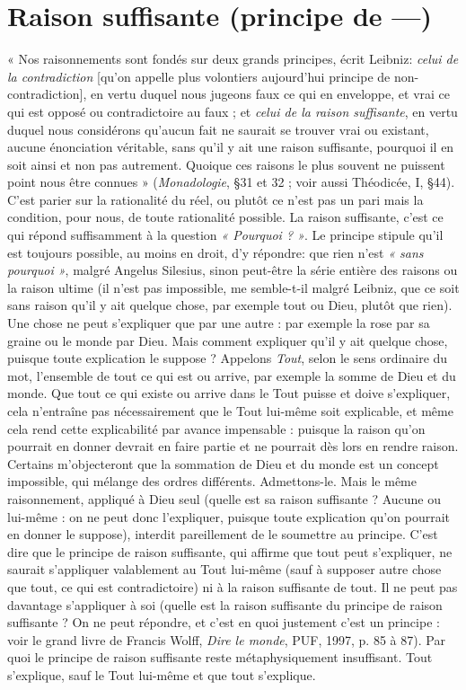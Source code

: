 \section{Raison suffisante (principe de —)}
« Nos raisonnements sont fondés sur deux grands principes,
écrit Leibniz: {\it celui de la contradiction} [qu’on appelle plus volontiers
aujourd’hui principe de non-contradiction], en vertu duquel nous jugeons
faux ce qui en enveloppe, et vrai ce qui est opposé ou contradictoire au faux ;
et {\it celui de la raison suffisante}, en vertu duquel nous considérons qu'aucun fait
ne saurait se trouver vrai ou existant, aucune énonciation véritable, sans qu'il
y ait une raison suffisante, pourquoi il en soit ainsi et non pas autrement.
Quoique ces raisons le plus souvent ne puissent point nous être connues »
({\it Monadologie}, \S 31 et 32 ; voir aussi Théodicée, I, \S 44). C’est parier sur la
rationalité du réel, ou plutôt ce n’est pas un pari mais la condition, pour
nous, de toute rationalité possible. La raison suffisante, c’est ce qui répond
suffisamment à la question {\it « Pourquoi ? »}. Le principe stipule qu’il est toujours
possible, au moins en droit, d'y répondre: que rien n’est {\it « sans
pourquoi »}, malgré Angelus Silesius, sinon peut-être la série entière des raisons
ou la raison ultime (il n’est pas impossible, me semble-t-il malgré Leibniz,
que ce soit sans raison qu'il y ait quelque chose, par exemple tout ou
Dieu, plutôt que rien). Une chose ne peut s’expliquer que par une autre : par
exemple la rose par sa graine ou le monde par Dieu. Mais comment expliquer
qu'il y ait quelque chose, puisque toute explication le suppose ? Appelons
{\it Tout}, selon le sens ordinaire du mot, l’ensemble de tout ce qui est ou arrive,
par exemple la somme de Dieu et du monde. Que tout ce qui existe ou arrive
dans le Tout puisse et doive s'expliquer, cela n’entraîne pas nécessairement
que le Tout lui-même soit explicable, et même cela rend cette explicabilité
par avance impensable : puisque la raison qu’on pourrait en donner devrait
en faire partie et ne pourrait dès lors en rendre raison. Certains m’objecteront
que la sommation de Dieu et du monde est un concept impossible, qui
mélange des ordres différents. Admettons-le. Mais le même raisonnement,
appliqué à Dieu seul (quelle est sa raison suffisante ? Aucune ou lui-même :
on ne peut donc l’expliquer, puisque toute explication qu’on pourrait en
donner le suppose), interdit pareillement de le soumettre au principe. C’est
dire que le principe de raison suffisante, qui affirme que tout peut s’expliquer,
ne saurait s’appliquer valablement au Tout lui-même (sauf à supposer
autre chose que tout, ce qui est contradictoire) ni à la raison suffisante de
tout. Il ne peut pas davantage s’appliquer à soi (quelle est la raison suffisante
du principe de raison suffisante ? On ne peut répondre, et c’est en quoi justement
c’est un principe : voir le grand livre de Francis Wolff, {\it Dire le monde},
PUF, 1997, p. 85 à 87). Par quoi le principe de raison suffisante reste métaphysiquement
insuffisant. Tout s'explique, sauf le Tout lui-même et que tout
s'explique.

